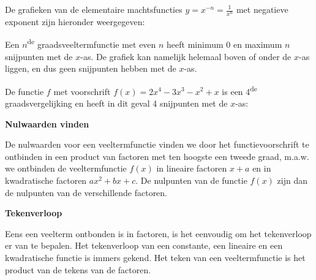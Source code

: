 De grafieken van de elementaire machtsfuncties $y=x^{-n}=\frac{1}{x^{n}}$
met negatieve exponent zijn hieronder weergegeven:


\begin{figure}[H]
	\centering 
	 
\end{figure}
 Een $n$\textsuperscript{de} graadsveeltermfunctie met even
$n$ heeft minimum $0$ en maximum $n$ snijpunten met de $x$-as. De grafiek
kan namelijk helemaal boven of onder de $x$-as liggen, en dus geen
snijpunten hebben met de $x$-as.



\begin{voorbeeld}
	De functie $f$ met voorschrift $f(x)=2x^{4}-3x^{3}-x^{2}+x$
is een 4\textsuperscript{de} graadsvergelijking en heeft in dit geval
4 snijpunten met de $x$-as:

\begin{figure}[H]
	\centering 

\end{figure}
\begin{figure}[H]
	\centering 
 
\end{figure}


\end{voorbeeld}

\textbf{Nulwaarden vinden}

De nulwaarden voor een veeltermfunctie vinden we door het
functievoorschrift te ontbinden in een product van factoren met ten
hoogste een tweede graad, m.a.w. we ontbinden de veeltermfunctie $f(x)$
in lineaire factoren $x+a$ en in kwadratische factoren $ax^{2}+bx+c$.
De nulpunten van de functie $f(x)$ zijn dan de nulpunten van de verschillende
factoren.

\textbf{Tekenverloop}

Eens een veelterm ontbonden is in factoren, is het eenvoudig
om het tekenverloop er van te bepalen. Het tekenverloop van een constante,
een lineaire en een kwadratische functie is immers gekend. Het teken
van een veeltermfunctie is het product van de tekens van de factoren.


